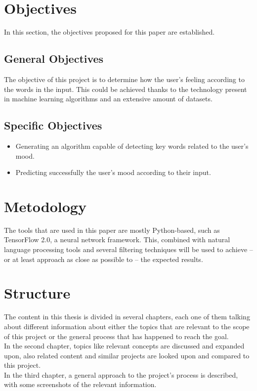 \section{Objectives}
In this section, the objectives proposed for this paper are established.

\subsection{General Objectives}
The objective of this project is to determine how the user's feeling according to the words in the input. This could be achieved thanks to the technology present in machine learning algorithms and an extensive amount of datasets.

\subsection{Specific Objectives}
\begin{itemize}
	\item Generating an algorithm capable of detecting key words related to the user's mood.
	\item Predicting successfully the user's mood according to their input.
\end{itemize}

\section{Metodology}
The tools that are used in this paper are mostly Python-based, such as TensorFlow 2.0, a neural network framework. This, combined with natural language processing tools and several filtering techniques will be used to achieve -- or at least approach as close as possible to -- the expected results.

\section{Structure}
The content in this thesis is divided in several chapters, each one of them talking about different information about either the topics that are relevant to the scope of this project or the general process that has happened to reach the goal.\\
In the second chapter, topics like relevant concepts are discussed and expanded upon, also related content and similar projects are looked upon and compared to this project.\\
In the third chapter, a general approach to the project's process is described, with some screenshots of the relevant information.
\clearpage